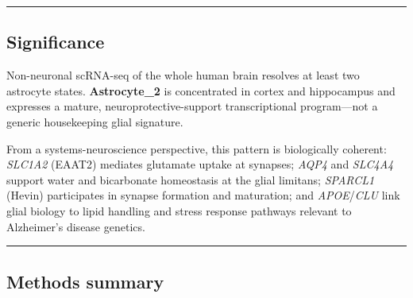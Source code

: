 \documentclass[
  11pt,
]{article}
\begin{document}
\begin{center}\rule{0.5\linewidth}{0.5pt}\end{center}

\subsection{Significance}\label{significance}

\begin{tcolorbox}[enhanced jigsaw, arc=.35mm, bottomrule=.15mm, bottomtitle=1mm, breakable, colback=white, colbacktitle=quarto-callout-note-color!10!white, colframe=quarto-callout-note-color-frame, coltitle=black, left=2mm, leftrule=.75mm, opacityback=0, opacitybacktitle=0.6, rightrule=.15mm, title=\textcolor{quarto-callout-note-color}{\faInfo}\hspace{0.5em}{Take-home message}, titlerule=0mm, toprule=.15mm, toptitle=1mm]

Non-neuronal scRNA-seq of the whole human brain resolves at least two
astrocyte states. \textbf{Astrocyte\_2} is concentrated in cortex and
hippocampus and expresses a mature, neuroprotective-support
transcriptional program---not a generic housekeeping glial signature.

\end{tcolorbox}

From a systems-neuroscience perspective, this pattern is biologically
coherent: \emph{SLC1A2} (EAAT2) mediates glutamate uptake at synapses;
\emph{AQP4} and \emph{SLC4A4} support water and bicarbonate homeostasis
at the glial limitans; \emph{SPARCL1} (Hevin) participates in synapse
formation and maturation; and \emph{APOE}/\emph{CLU} link glial biology
to lipid handling and stress response pathways relevant to Alzheimer's
disease genetics.

\begin{center}\rule{0.5\linewidth}{0.5pt}\end{center}

\subsection{Methods summary}\label{methods-summary}
\end{document}

